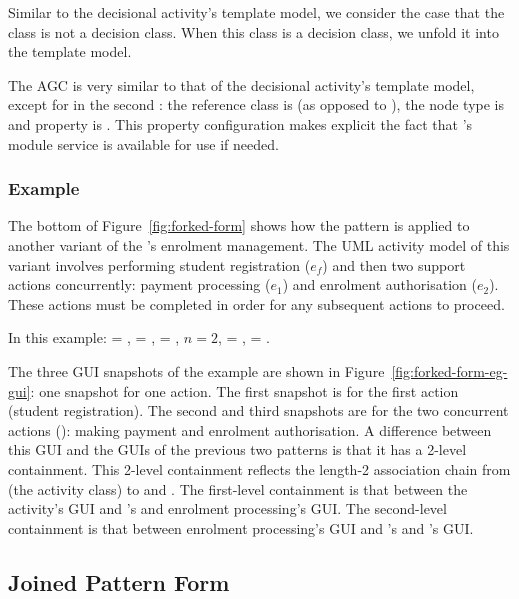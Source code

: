 Similar to the decisional activity's template model, we consider the case that the class  is not a decision class. When this class is a decision class, we unfold it into the template model.

The AGC is very similar to that of the decisional activity's template model, except for in the second : the reference class is  (as opposed to ), the node type is  and property  is . This property configuration makes explicit the fact that 's module service is available for use if needed.
%
\subsubsection*{Example}
The bottom of Figure~\ref{fig:forked-form} shows how the pattern is applied to another variant of the \courseman's enrolment management. The UML activity model of this variant involves performing student registration ($ e_f $) and then two support actions concurrently: payment processing ($ e_1 $) and enrolment authorisation ($ e_2 $). These actions must be completed in order for any subsequent actions to proceed.

In this example:  = ,  = ,  = , $ n = 2 $,  = ,  = .

The three GUI snapshots of the example are shown in Figure~\ref{fig:forked-form-eg-gui}: one snapshot for one action. The first snapshot is for the first action (student registration). The second and third snapshots are for the two concurrent actions (\resp): making payment and enrolment authorisation. A difference between this GUI and the GUIs of the previous two patterns is that it has a 2-level containment. This 2-level containment reflects the length-2 association chain from  (the activity class) to  and . The first-level containment is that between the activity's GUI and 's and enrolment processing's GUI. The second-level containment is that between enrolment processing's GUI and 's and 's GUI.

\subsection{Joined Pattern Form} \label{sect:joined-pattern}

